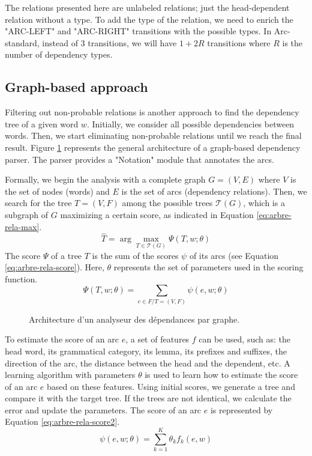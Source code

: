 \documentclass{KodeBook}
\begin{document}
The relations presented here are unlabeled relations; just the head-dependent relation without a type. To add the type of the relation, we need to enrich the "ARC-LEFT" and "ARC-RIGHT" transitions with the possible types. In Arc-standard, instead of 3 transitions, we will have $1+2R$ transitions where $R$ is the number of dependency types.


\subsection{Graph-based approach}

Filtering out non-probable relations is another approach to find the dependency tree of a given word $w$. Initially, we consider all possible dependencies between words. Then, we start eliminating non-probable relations until we reach the final result. Figure \ref{fig:dep-graph-arch} represents the general architecture of a graph-based dependency parser. The parser provides a "Notation" module that annotates the arcs.

Formally, we begin the analysis with a complete graph $G = (V, E)$ where $V$ is the set of nodes (words) and $E$ is the set of arcs (dependency relations). Then, we search for the tree $T = (V, F)$ among the possible trees $\mathcal{T}(G)$, which is a subgraph of $G$ maximizing a certain score, as indicated in Equation \ref{eq:arbre-rela-max}.
\begin{equation}
\hat{T} = \arg\max\limits_{T \in \mathcal{T}(G)} \Psi(T, w; \theta)
\label{eq:arbre-rela-max}
\end{equation}
The score $\Psi$ of a tree $T$ is the sum of the scores $\psi$ of its arcs (see Equation \ref{eq:arbre-rela-score}). 
Here, $\theta$ represents the set of parameters used in the scoring function.
\begin{equation}
\Psi(T, w; \theta) = \sum_{e \in F / T = (V, F)} \psi(e, w; \theta)
\label{eq:arbre-rela-score}
\end{equation}

\begin{figure}[ht]
	\centering
	\caption{Architecture d'un analyseur des dépendances par graphe.}
	\label{fig:dep-graph-arch}
\end{figure}

To estimate the score of an arc $e$, a set of features $f$ can be used, such as: the head word, its grammatical category, its lemma, its prefixes and suffixes, the direction of the arc, the distance between the head and the dependent, etc.
A learning algorithm with parameters $\theta$ is used to learn how to estimate the score of an arc $e$ based on these features.
Using initial scores, we generate a tree and compare it with the target tree.
If the trees are not identical, we calculate the error and update the parameters.
The score of an arc $e$ is represented by Equation \ref{eq:arbre-rela-score2}.
\begin{equation}
\psi(e, w; \theta) = \sum_{k = 1}^{K} \theta_k f_k(e, w)
\label{eq:arbre-rela-score2}
\end{equation}
\end{document}
